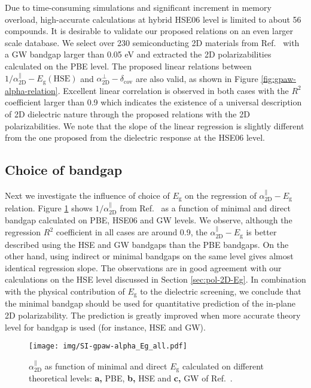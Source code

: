 \documentclass[manuscript=suppinfo,email=true,hyperref=true,keywords=false]{achemso}
\begin{document}
Due to time-consuming simulations and significant increment in 
memory overload, high-accurate calculations at hybrid HSE06 level is limited 
to about 56 compounds. 
It is desirable to validate our proposed
relations on an even larger scale database. We select over 230
semiconducting 2D materials from Ref.~ 
with a GW bandgap
larger than 0.05 eV and extracted the 2D polarizabilities calculated
on the PBE level. The proposed linear relations between
$1/\alpha_{\mathrm{2D}}^{\parallel}-E_{\mathrm{g}}(\mathrm{HSE})$ and
$\alpha_{\mathrm{2D}}^{\perp}-\delta_{\mathrm{cov}}$ are also valid,
as shown in Figure \ref{fig:gpaw-alpha-relation}. Excellent linear
correlation is observed in both cases with the $R^{2}$ coefficient
larger than 0.9 which indicates the existence of a universal description 
of 2D dielectric nature through the proposed relations with the 2D
polarizabilities. We note that the slope of the linear regression is
slightly different from the one proposed from the dielectric
response at the HSE06 level. 

\subsection{Choice of bandgap}
\label{sec:gpaw-2}

Next we investigate the influence of choice of $E_{\mathrm{g}}$ on the
regression of $\alpha_{\mathrm{2D}}^{\parallel}-E_{\mathrm{g}}$ relation. Figure
\ref{fig:SI-gpaw-alpha-Eg-all} shows $1/\alpha_{\mathrm{2D}}^{\parallel}$ from 
Ref.~ as a function of minimal and direct bandgap calculated
on PBE, HSE06 and GW levels. We observe,
although the regression $R^{2}$ coefficient in all cases are around
0.9, the $\alpha_{\mathrm{2D}}^{\parallel}-E_{\mathrm{g}}$ is better described using
the HSE and GW bandgaps than the PBE bandgaps. On the other hand,
using indirect or minimal bandgaps on the same level gives almost
identical regression slope. The observations are in good agreement
with our calculations on the HSE level discussed in Section
\ref{sec:pol-2D-Eg}. In combination with the physical contribution of
$E_{\mathrm{g}}$ to the dielectric screening, we conclude that the
minimal bandgap should be used for quantitative prediction of the
in-plane 2D polarizability. The prediction is greatly improved when
more accurate theory level for bandgap is used (for instance, HSE and GW).

\begin{figure}[htbp]
  \centering
  \texttt{[image: img/SI-gpaw-alpha\_Eg\_all.pdf]}
  \caption{$\alpha_{\mathrm{2D}}^{\parallel}$ as function of minimal and direct
    $E_{\mathrm{g}}$ calculated on different theoretical levels:
    \textbf{a,} PBE, \textbf{b,} HSE and \textbf{c,} GW of Ref.~.}
  \label{fig:SI-gpaw-alpha-Eg-all}
\end{figure}
\end{document}
